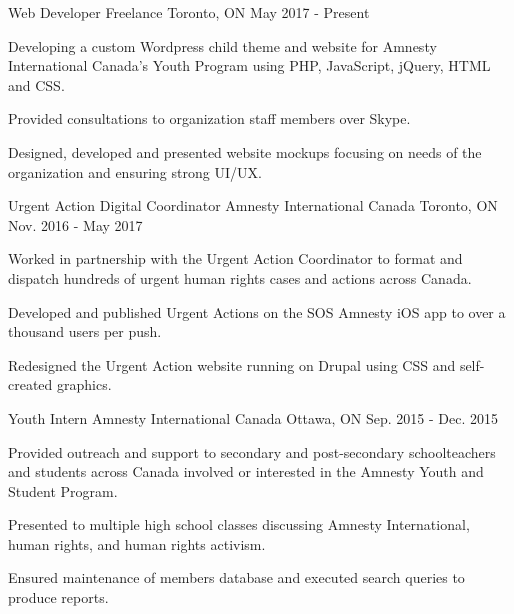 

\begin{cventries}

  \cventry
    {Web Developer} %
    {Freelance} %
    {Toronto, ON} %
    {May 2017 - Present} %
    {
      \begin{cvitems} %
        \item {Developing a custom Wordpress child theme and website for Amnesty International Canada's Youth Program using PHP, JavaScript, jQuery, HTML and CSS.}
        \item {Provided consultations to organization staff members over Skype.}
        \item {Designed, developed and presented website mockups focusing on needs of the organization and ensuring strong UI/UX.}
      \end{cvitems}
    }

  \cventry
    {Urgent Action Digital Coordinator} %
    {Amnesty International Canada} %
    {Toronto, ON} %
    {Nov. 2016 - May 2017} %
    {
      \begin{cvitems} %
        \item {Worked in partnership with the Urgent Action Coordinator to format and dispatch hundreds of urgent human rights cases and actions across Canada.}
        \item {Developed and published Urgent Actions on the SOS Amnesty iOS app to over a thousand users per push.}
        \item {Redesigned the Urgent Action website running on Drupal using CSS and self-created graphics. }
      \end{cvitems}
    }

  \cventry
    {Youth Intern} %
    {Amnesty International Canada} %
    {Ottawa, ON} %
    {Sep. 2015 - Dec. 2015} %
    {
      \begin{cvitems} %
      \item {Provided outreach and support to secondary and post-secondary schoolteachers and students across Canada involved or interested in the Amnesty Youth and Student Program.}
		\item {Presented to multiple high school classes discussing Amnesty International, human rights, and human rights activism.}
        \item {Ensured maintenance of members database and executed search queries to produce reports.}
      \end{cvitems}
    }
    

\end{cventries}

